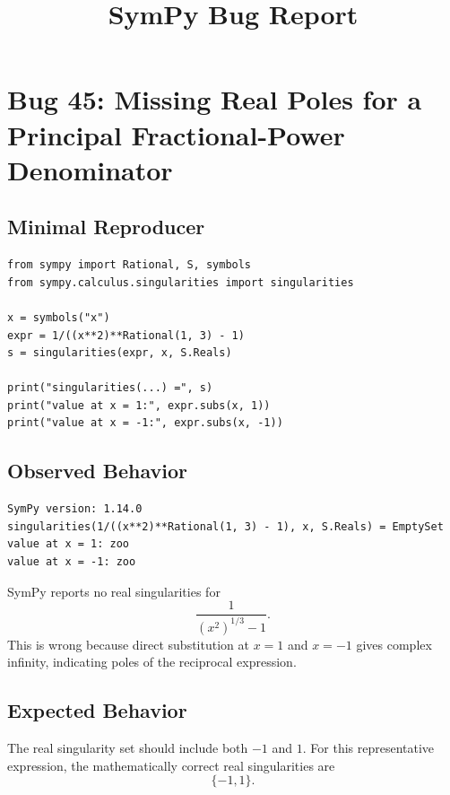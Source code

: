 \documentclass[11pt]{article}
\title{SymPy Bug Report}
\author{}
\date{}
\begin{document}
\maketitle

\section{Bug 45: Missing Real Poles for a Principal Fractional-Power Denominator}

\subsection{Minimal Reproducer}

\medskip

\begin{lstlisting}[style=bugpython]
from sympy import Rational, S, symbols
from sympy.calculus.singularities import singularities

x = symbols("x")
expr = 1/((x**2)**Rational(1, 3) - 1)
s = singularities(expr, x, S.Reals)

print("singularities(...) =", s)
print("value at x = 1:", expr.subs(x, 1))
print("value at x = -1:", expr.subs(x, -1))
\end{lstlisting}

\subsection{Observed Behavior}

\medskip

\begin{lstlisting}[style=bugpython]
SymPy version: 1.14.0
singularities(1/((x**2)**Rational(1, 3) - 1), x, S.Reals) = EmptySet
value at x = 1: zoo
value at x = -1: zoo
\end{lstlisting}

\noindent
SymPy reports no real singularities for
\[
    \frac{1}{(x^2)^{1/3}-1}.
\]
This is wrong because direct substitution at \(x=1\) and \(x=-1\) gives
complex infinity, indicating poles of the reciprocal expression.

\subsection{Expected Behavior}

The real singularity set should include both \(-1\) and \(1\). For this
representative expression, the mathematically correct real singularities are
\[
    \{-1,1\}.
\]
\end{document}

